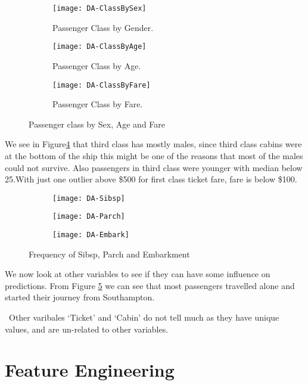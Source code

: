 \documentclass[a4paper,10pt]{report}
\begin{document}
\begin{figure}[h]
\centering
  \begin{subfigure}[b]{0.4\textwidth}
    \texttt{[image: DA-ClassBySex]}
    \caption{Passenger Class by Gender.} \label{ClassBySex}
  \end{subfigure}
  \begin{subfigure}[b]{0.4\textwidth}
    \texttt{[image: DA-ClassByAge]}
    \caption{Passenger Class by Age.} \label{ClassByAge}
  \end{subfigure}
  \begin{subfigure}[b]{0.4\textwidth}
    \texttt{[image: DA-ClassByFare]}
    \caption{Passenger Class by Fare.} \label{ClassByFare}
  \end{subfigure}
  \caption{Passenger class by Sex, Age and Fare}\label{Class}
\end{figure}
We see in Figure\ref{Class} that third class has mostly males, since third class cabins were at the bottom of the ship this might be one of the reasons that most of the males could not survive. Also passengers in third class were younger with median below 25.With just one outlier above \$500 for first class ticket fare, fare is below \$100.


\begin{figure}[h]
\centering
  \begin{subfigure}[b]{0.4\textwidth}
    \texttt{[image: DA-Sibsp]}
    \end{subfigure}
  \begin{subfigure}[b]{0.4\textwidth}
    \texttt{[image: DA-Parch]}
    \end{subfigure}
  \begin{subfigure}[b]{0.4\textwidth}
    \texttt{[image: DA-Embark]}
  \end{subfigure}
  \caption{Frequency of Sibsp, Parch and Embarkment}\label{Var}
\end{figure}
We now look at other variables to see if they can have some influence on predictions. From Figure \ref{Var} we can see that  most passengers travelled alone and started their journey from Southampton.

\ Other varibales `Ticket' and `Cabin' do not tell much as they have unique values, and are un-related to other variables.


\section{Feature Engineering}
\end{document}
